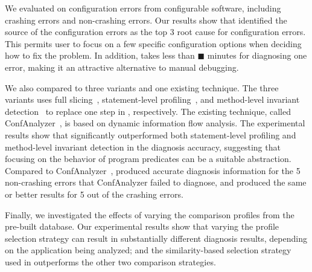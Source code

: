 We evaluated \ourtool on \errors configuration errors
from \subjectnum configurable software, including
\crash crashing errors and \noncrash non-crashing errors.
Our results show that \ourtool identified the source
of the configuration errors as the top 3 root cause
for \topnum configuration errors.
This permits \ourtool user to focus on a few specific configuration
options when deciding how to fix the problem. 
In addition, \ourtool takes less than $\blacksquare$ minutes for diagnosing
one error, making it an attractive alternative
to manual debugging.

We also compared \ourtool to three variants and one
existing technique. The three variants uses
full slicing~\cite{}, statement-level profiling~\cite{Jones:2002},
and method-level invariant detection~\cite{Ernst:1999}
to replace one step in \ourtool, respectively.
The existing technique, called ConfAnalyzer~\cite{Rabkin:2011:PPC}, is
based on dynamic information flow analysis.
The experimental results show that
\ourtool significantly outperformed both statement-level profiling
and method-level invariant detection in the diagnosis accuracy, suggesting
that focusing on the behavior of program predicates can be a
suitable abstraction. Compared to ConfAnalyzer~\cite{}, 
\ourtool produced accurate diagnosis information for the 5
non-crashing errors that ConfAnalyzer failed to diagnose,
and produced the same or better results
for 5 out of the \crash crashing errors. 

Finally, we investigated the effects of varying the comparison profiles
from the pre-built database.
Our experimental results show that varying the
profile selection strategy can result in substantially different
diagnosis results, depending on the application being analyzed;
and the similarity-based selection strategy used in \ourtool outperforms
the other two comparison strategies.






